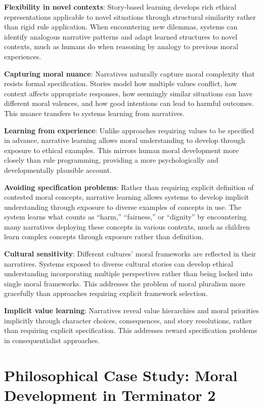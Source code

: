 \documentclass[12pt]{article}
\begin{document}
\textbf{Flexibility in novel contexts}: Story-based learning develops rich ethical representations applicable to novel situations through structural similarity rather than rigid rule application. When encountering new dilemmas, systems can identify analogous narrative patterns and adapt learned structures to novel contexts, much as humans do when reasoning by analogy to previous moral experiences.

\textbf{Capturing moral nuance}: Narratives naturally capture moral complexity that resists formal specification. Stories model how multiple values conflict, how context affects appropriate responses, how seemingly similar situations can have different moral valences, and how good intentions can lead to harmful outcomes. This nuance transfers to systems learning from narratives.

\textbf{Learning from experience}: Unlike approaches requiring values to be specified in advance, narrative learning allows moral understanding to develop through exposure to ethical examples. This mirrors human moral development more closely than rule programming, providing a more psychologically and developmentally plausible account.

\textbf{Avoiding specification problems}: Rather than requiring explicit definition of contested moral concepts, narrative learning allows systems to develop implicit understanding through exposure to diverse examples of concepts in use. The system learns what counts as ``harm,'' ``fairness,'' or ``dignity'' by encountering many narratives deploying these concepts in various contexts, much as children learn complex concepts through exposure rather than definition.

\textbf{Cultural sensitivity}: Different cultures' moral frameworks are reflected in their narratives. Systems exposed to diverse cultural stories can develop ethical understanding incorporating multiple perspectives rather than being locked into single moral frameworks. This addresses the problem of moral pluralism more gracefully than approaches requiring explicit framework selection.

\textbf{Implicit value learning}: Narratives reveal value hierarchies and moral priorities implicitly through character choices, consequences, and story resolutions, rather than requiring explicit specification. This addresses reward specification problems in consequentialist approaches.

\section{Philosophical Case Study: Moral Development in Terminator 2}
\end{document}
